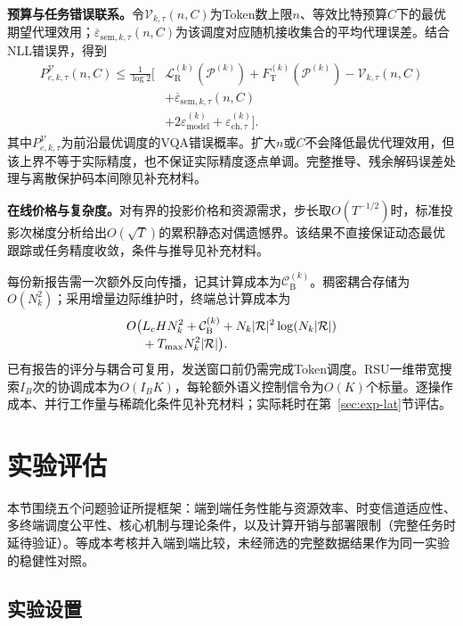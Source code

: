 \documentclass[journal]{IEEEtran}
\begin{document}
\textbf{预算与任务错误联系。}令$\mathcal V_{k,\tau}(n,C)$为Token数上限$n$、等效比特预算$C$下的最优期望代理效用；$\overline\varepsilon_{\mathrm{sem},k,\tau}(n,C)$为该调度对应随机接收集合的平均代理误差。结合NLL错误界，得到
\begin{equation}
\begin{split}
P_{e,k,\tau}^{\mathcal V}(n,C)
\leq\frac{1}{\log 2}\big[&\mathcal L_{\mathrm R}^{(k)}(\mathcal P^{(k)})
+F_{\mathrm T}^{(k)}(\mathcal P^{(k)})
-\mathcal V_{k,\tau}(n,C)\\
&+\overline\varepsilon_{\mathrm{sem},k,\tau}(n,C)\\
&+2\varepsilon_{\mathrm{model}}^{(k)}
+\varepsilon_{\mathrm{ch},\tau}^{(k)}\big].
\end{split}
\label{eq:rate_retention_vqa_boundary}
\end{equation}
其中$P_{e,k,\tau}^{\mathcal V}$为前沿最优调度的VQA错误概率。扩大$n$或$C$不会降低最优代理效用，但该上界不等于实际精度，也不保证实际精度逐点单调。完整推导、残余解码误差处理与离散保护码本间隙见补充材料。

\textbf{在线价格与复杂度。}对有界的投影价格和资源需求，步长取$O(T^{-1/2})$时，标准投影次梯度分析给出$O(\sqrt T)$的累积静态对偶遗憾界。该结果不直接保证动态最优跟踪或任务精度收敛，条件与推导见补充材料。

每份新报告需一次额外反向传播，记其计算成本为$\mathcal C_{\mathrm B}^{(k)}$。稠密耦合存储为$O(N_k^2)$；采用增量边际维护时，终端总计算成本为
\begin{align}
O\big(&L_cHN_k^2+\mathcal C_{\mathrm B}^{(k)}
+N_k|\mathcal R|^2\log(N_k|\mathcal R|)
\notag\\[-0.2em]
&+T_{\max}N_k^2|\mathcal R|\big).
\label{eq:complexity}
\end{align}
已有报告的评分与耦合可复用，发送窗口前仍需完成Token调度。RSU一维带宽搜索$I_B$次的协调成本为$O(I_BK)$，每轮额外语义控制信令为$O(K)$个标量。逐操作成本、并行工作量与稀疏化条件见补充材料；实际耗时在第~\ref{sec:exp-lat}节评估。

\section{实验评估}
\label{sec:exp}

本节围绕五个问题验证所提框架：端到端任务性能与资源效率、时变信道适应性、多终端调度公平性、核心机制与理论条件，以及计算开销与部署限制（完整任务时延待验证）。等成本考核并入端到端比较，未经筛选的完整数据结果作为同一实验的稳健性对照。

\subsection{实验设置}
\end{document}
